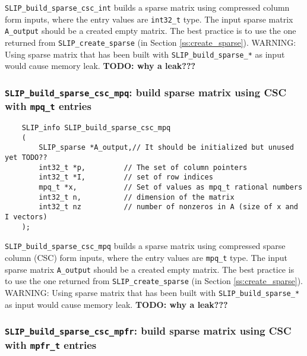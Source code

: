 \documentclass[12pt]{article}
\theoremstyle{definition}
\begin{document}
\verb|SLIP_build_sparse_csc_int| builds a sparse matrix using compressed column
form inputs, where the entry values are \verb|int32_t| type. The input sparse
matrix \verb|A_output| should be a created empty matrix. The best practice is
to use the one returned from \verb|SLIP_create_sparse| (in Section
\ref{ss:create_sparse}). WARNING: Using sparse matrix that has been built with
\verb|SLIP_build_sparse_*| as input would cause memory leak.
{\bf TODO: why a leak???} %

\cprotect\subsubsection{\verb|SLIP_build_sparse_csc_mpq|: build sparse matrix using CSC with \verb|mpq_t| entries}
\label{s:user:build_sparse_csc_mpq}

\begin{mdframed}[userdefinedwidth=6in]
{\footnotesize
\begin{verbatim}
    SLIP_info SLIP_build_sparse_csc_mpq
    (
        SLIP_sparse *A_output,// It should be initialized but unused yet TODO??
        int32_t *p,         // The set of column pointers
        int32_t *I,         // set of row indices
        mpq_t *x,           // Set of values as mpq_t rational numbers
        int32_t n,          // dimension of the matrix
        int32_t nz          // number of nonzeros in A (size of x and I vectors)
    );
\end{verbatim}
} \end{mdframed}

\verb|SLIP_build_sparse_csc_mpq| builds a sparse matrix using compressed
sparse column (CSC) form inputs, where the entry values are \verb|mpq_t| type.
The input sparse matrix \verb|A_output| should be a created empty matrix. The
best practice is to use the one returned from \verb|SLIP_create_sparse| (in
Section \ref{ss:create_sparse}). WARNING: Using sparse matrix that has been
built with \verb|SLIP_build_sparse_*| as input would cause memory leak.
{\bf TODO: why a leak???} %

\cprotect\subsubsection{\verb|SLIP_build_sparse_csc_mpfr|: build sparse matrix using CSC with \verb|mpfr_t| entries}
\label{s:user:build_sparse_csc_mpfr}
\end{document}
